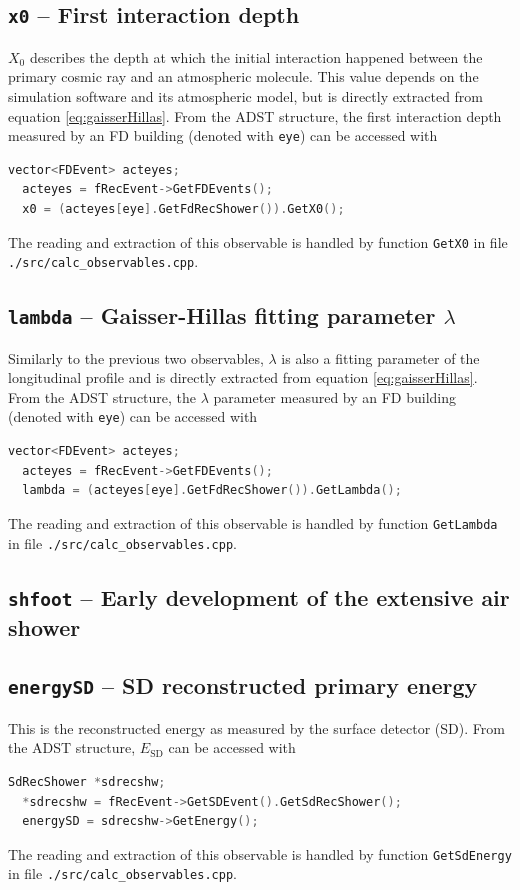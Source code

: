 \documentclass[12pt,a4paper]{report}
\begin{document}
\subsection{\texttt{x0} -- First interaction depth}
$X_0$ describes the depth at which the initial interaction happened between the primary cosmic ray and an atmospheric molecule. This value depends on the simulation software and its atmospheric model, but is directly extracted from equation \eqref{eq:gaisserHillas}. From the ADST structure, the first interaction depth measured by an FD building (denoted with \texttt{eye}) can be accessed with
\begin{lstlisting}[language=C++]
  vector<FDEvent> acteyes;
  acteyes = fRecEvent->GetFDEvents();
  x0 = (acteyes[eye].GetFdRecShower()).GetX0();
\end{lstlisting}
The reading and extraction of this observable is handled by function \texttt{GetX0} in file \texttt{./src/calc\_observables.cpp}.

\subsection{\texttt{lambda} -- Gaisser-Hillas fitting parameter $\lambda$}
Similarly to the previous two observables, $\lambda$ is also a fitting parameter of the longitudinal profile and is directly extracted from equation \eqref{eq:gaisserHillas}. From the ADST structure, the $\lambda$ parameter measured by an FD building (denoted with \texttt{eye}) can be accessed with
\begin{lstlisting}[language=C++]
  vector<FDEvent> acteyes;
  acteyes = fRecEvent->GetFDEvents();
  lambda = (acteyes[eye].GetFdRecShower()).GetLambda();
\end{lstlisting}
The reading and extraction of this observable is handled by function \texttt{GetLambda} in file \texttt{./src/calc\_observables.cpp}.

\subsection{\texttt{shfoot} -- Early development of the extensive air shower}
\subsection{\texttt{energySD} -- SD reconstructed primary energy}
This is the reconstructed energy as measured by the surface detector (SD). From the ADST structure, $E_{\textrm{SD}}$ can be accessed with
\begin{lstlisting}[language=C++]
  SdRecShower *sdrecshw;
  *sdrecshw = fRecEvent->GetSDEvent().GetSdRecShower();
  energySD = sdrecshw->GetEnergy();
\end{lstlisting}
The reading and extraction of this observable is handled by function \texttt{GetSdEnergy} in file \texttt{./src/calc\_observables.cpp}.
\end{document}
